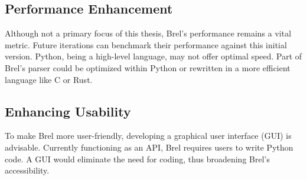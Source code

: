 

\subsection{Performance Enhancement}

Although not a primary focus of this thesis, Brel's performance remains a vital metric.
Future iterations can benchmark their performance against this initial version.
Python, being a high-level language, may not offer optimal speed.
Part of Brel's parser could be optimized within Python or rewritten in a more efficient language like C or Rust.



\subsection{Enhancing Usability}

To make Brel more user-friendly, developing a graphical user interface (GUI) is advisable.
Currently functioning as an API, Brel requires users to write Python code.
A GUI would eliminate the need for coding, thus broadening Brel's accessibility.



